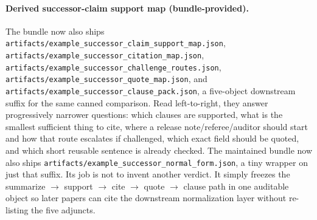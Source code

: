 \documentclass[11pt]{article}
\begin{document}
\paragraph{Derived successor-claim support map (bundle-provided).}
The bundle now also ships \texttt{artifacts/example\_successor\_claim\_support\_map.json}, \texttt{artifacts/example\_successor\_citation\_map.json}, \texttt{artifacts/example\_successor\_challenge\_routes.json}, \texttt{artifacts/example\_successor\_quote\_map.json}, and \texttt{artifacts/example\_successor\_clause\_pack.json}, a five-object downstream suffix for the same canned comparison.
Read left-to-right, they answer progressively narrower questions: which clauses are supported, what is the smallest sufficient thing to cite, where a release note/referee/auditor should start and how that route escalates if challenged, which exact field should be quoted, and which short reusable sentence is already checked.
The maintained bundle now also ships \texttt{artifacts/example\_successor\_normal\_form.json}, a tiny wrapper on just that suffix.
Its job is not to invent another verdict.
It simply freezes the summarize $\to$ support $\to$ cite $\to$ quote $\to$ clause path in one auditable object so later papers can cite the downstream normalization layer without re-listing the five adjuncts.
\end{document}
